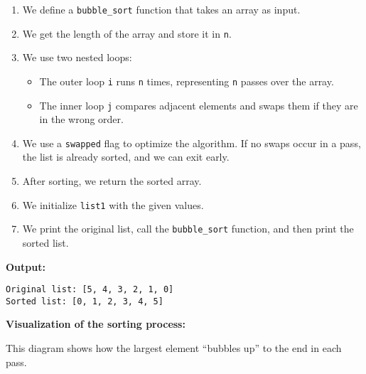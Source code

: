 \begin{enumerate}
\def\labelenumi{\arabic{enumi}.}
\tightlist
\item
  We define a \texttt{bubble\_sort} function that takes an array as
  input.
\item
  We get the length of the array and store it in \texttt{n}.
\item
  We use two nested loops:

  \begin{itemize}
  \tightlist
  \item
    The outer loop \texttt{i} runs \texttt{n} times, representing
    \texttt{n} passes over the array.
  \item
    The inner loop \texttt{j} compares adjacent elements and swaps them
    if they are in the wrong order.
  \end{itemize}
\item
  We use a \texttt{swapped} flag to optimize the algorithm. If no swaps
  occur in a pass, the list is already sorted, and we can exit early.
\item
  After sorting, we return the sorted array.
\item
  We initialize \texttt{list1} with the given values.
\item
  We print the original list, call the \texttt{bubble\_sort} function,
  and then print the sorted list.
\end{enumerate}

\textbf{Output:}

\begin{verbatim}
Original list: [5, 4, 3, 2, 1, 0]
Sorted list: [0, 1, 2, 3, 4, 5]
\end{verbatim}

\textbf{Visualization of the sorting process:}

\begin{Shaded}
\begin{Highlighting}[]
\end{Highlighting}
\end{Shaded}

This diagram shows how the largest element ``bubbles up'' to the end in
each pass.

